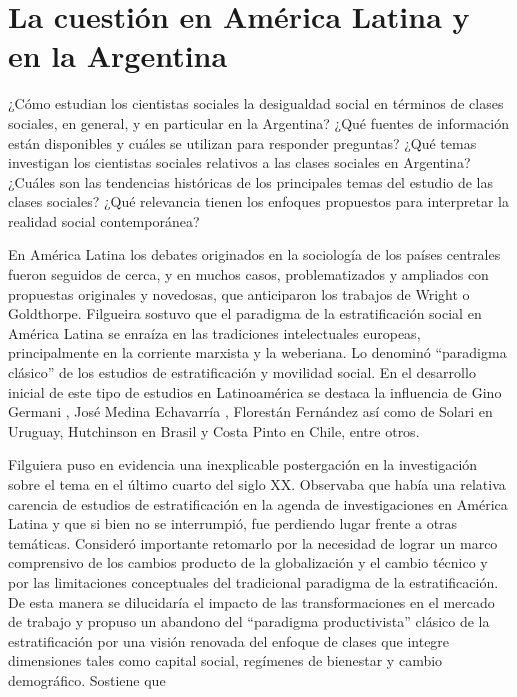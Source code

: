 \documentclass[
]{book}
\begin{document}
\hypertarget{cuestion}{%
\section{La cuestión en América Latina y en la Argentina}\label{cuestion}}

¿Cómo estudian los cientistas sociales la desigualdad social en términos de clases sociales, en general, y en particular en la Argentina? ¿Qué fuentes de información están disponibles y cuáles se utilizan para responder preguntas? ¿Qué temas investigan los cientistas sociales relativos a las clases sociales en Argentina? ¿Cuáles son las tendencias históricas de los principales temas del estudio de las clases sociales? ¿Qué relevancia tienen los enfoques propuestos para interpretar la realidad social contemporánea?

En América Latina los debates originados en la sociología de los países centrales fueron seguidos de cerca, y en muchos casos, problematizados y ampliados con propuestas originales y novedosas, que anticiparon los trabajos de Wright o Goldthorpe. Filgueira \citeyearpar{Filgueira2001} sostuvo que el paradigma de la estratificación social en América Latina se enraíza en las tradiciones intelectuales europeas, principalmente en la corriente marxista y la weberiana. Lo denominó ``paradigma clásico'' de los estudios de estratificación y movilidad social. En el desarrollo inicial de este tipo de estudios en Latinoamérica se destaca la influencia de Gino Germani \citeyearpar{Germani1987}, José Medina Echavarría \citeyearpar{MedinaEchavarria1964}, Florestán Fernández \citeyearpar{Fernandes1998} así como de Solari en Uruguay, Hutchinson en Brasil y Costa Pinto en Chile, entre otros.

Filguiera \citeyearpar{Filgueira2001} puso en evidencia una inexplicable postergación en la investigación sobre el tema en el último cuarto del siglo XX. Observaba que había una relativa carencia de estudios de estratificación en la agenda de investigaciones en América Latina y que si bien no se interrumpió, fue perdiendo lugar frente a otras temáticas. Consideró importante retomarlo por la necesidad de lograr un marco comprensivo de los cambios producto de la globalización y el cambio técnico y por las limitaciones conceptuales del tradicional paradigma de la estratificación. De esta manera se dilucidaría el impacto de las transformaciones en el mercado de trabajo y propuso un abandono del ``paradigma productivista'' clásico de la estratificación por una visión renovada del enfoque de clases que integre dimensiones tales como capital social, regímenes de bienestar y cambio demográfico. Sostiene que
\end{document}

